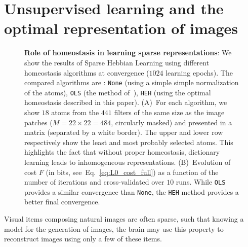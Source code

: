 \documentclass[draft]{article} %
\newcommand{\seeFig}[1]{Figure~\ref{fig:#1}}%
\newcommand{\seeEq}[1]{Eq.~\ref{eq:#1}}%
\begin{document}
\section{Unsupervised learning and the optimal representation of images}%
% 
\begin{figure}%
\caption{
{\bf Role of homeostasis in learning sparse representations}:
We show the results of Sparse Hebbian Learning using different homeostasis algorithms at convergence ($1024$ learning epochs). The compared algorithms are : \texttt{None} (using a simple simple normalization of the atoms), \texttt{OLS} (the method of~\citep{Olshausen97}), \texttt{HEH} (using the optimal homeostasis described in this paper). {\sf (A)}~For each algorithm, we show $18$ atoms from the $441$ filters of the same size as the image patches ($M= 22 \times 22=484$, circularly masked) and presented in a matrix (separated by a white border). The upper and lower row respectively show the least and most probably selected atoms. This highlights the fact that without proper homeostasis, dictionary learning leads to inhomogeneous representations. {\sf (B)}~Evolution of cost  $F$ (in bits, see~\seeEq{L0_cost_full}) as a function of the number of iterations and cross-validated over $10$ runs. While \texttt{OLS} provides a similar convergence than  \texttt{None}, the \texttt{HEH}  method provides a better final convergence.%
\label{fig:map}}%
\end{figure}%
Visual items composing natural images are often sparse, such that knowing a model for the generation of images, the brain may use this property to reconstruct images using only a few of these items.
\end{document}

